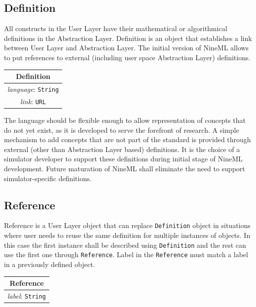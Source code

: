 \documentclass{article}
\begin{document}
\subsection{Definition}

All constructs in the User Layer have their mathematical or algorithmical
definitions in the Abstraction Layer. Definition is an object that
establishes a link between User Layer and Abstraction Layer. The initial
version of NineML allows to put references to external (including user
space Abstraction Layer) definitions.

\begin{table}[htb]
\center
\begin{tabular}{|c|}
\hline
\hline
Definition \\
\hline
\hline
{\em language}: {\tt String} \\
\hline
{\em link}: {\tt URL}\\
\hline
\end{tabular}
\end{table}

The language should be flexible enough to allow representation of concepts
that do not yet exist, as it is developed to serve the forefront of research.
A simple mechanism to add concepts that are not part of the standard is
provided through external (other than Abstraction Layer based) definitions.
It is the choice of a simulator developer to support these definitions during
initial stage of NineML development. Future
maturation of NineML shall eliminate the need to support simulator-specific
definitions.

\subsection{Reference}

Reference is a User Layer object that can replace {\tt Definition} object
in situations where user needs to reuse the same definition for multiple
instances of objects. In this case the first instance shall be described using
{\tt Definition} and the rest can use the first one through {\tt Reference}.
Label in the {\tt Reference} must match a label in a previously defined
object.

\begin{table}[htb]
\center
\begin{tabular}{|c|}
\hline
\hline
Reference \\
\hline
\hline
{\em label}: {\tt String} \\
\hline
\end{tabular}
\end{table}
\end{document}
